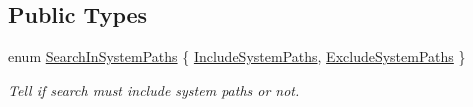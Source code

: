 \subsection*{Public Types}
\begin{DoxyCompactItemize}
\item 
enum \hyperlink{class_mdt_1_1_deploy_utils_1_1_library_ab9f58dba8290dd1882a21d73cc7c10d0}{Search\+In\+System\+Paths} \{ \hyperlink{class_mdt_1_1_deploy_utils_1_1_library_ab9f58dba8290dd1882a21d73cc7c10d0adabc8cd036aa884536c359cc3a2783ca}{Include\+System\+Paths}, 
\hyperlink{class_mdt_1_1_deploy_utils_1_1_library_ab9f58dba8290dd1882a21d73cc7c10d0ad00095fee49be0d8f0e8c7467dc8ebec}{Exclude\+System\+Paths}
 \}\begin{DoxyCompactList}\small\item\em Tell if search must include system paths or not. \end{DoxyCompactList}
\end{DoxyCompactItemize}
